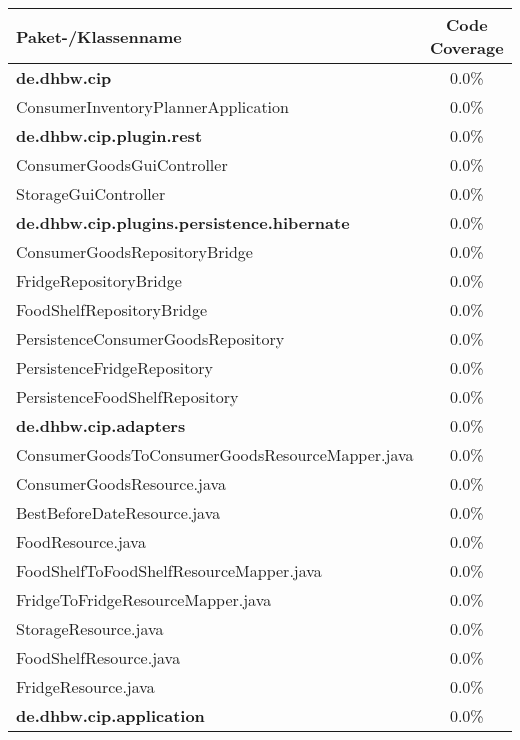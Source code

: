 \begin{table}[ht]
    \begin{tabular}{|l|c|}
        \hline
        \textbf{Paket-/Klassenname} & \textbf{Code Coverage} \\
        \hline
        \textbf{de.dhbw.cip} & 0.0\% \\
        \hline
        ConsumerInventoryPlannerApplication & 0.0\% \\
        \hline
        \textbf{de.dhbw.cip.plugin.rest} & 0.0\% \\
        \hline
        ConsumerGoodsGuiController & 0.0\% \\
        \hline
        StorageGuiController & 0.0\% \\
        \hline
        \textbf{de.dhbw.cip.plugins.persistence.hibernate} & 0.0\% \\
        \hline
        ConsumerGoodsRepositoryBridge & 0.0\% \\
        \hline
        FridgeRepositoryBridge & 0.0\% \\
        \hline
        FoodShelfRepositoryBridge & 0.0\% \\
        \hline
        PersistenceConsumerGoodsRepository & 0.0\% \\
        \hline
        PersistenceFridgeRepository & 0.0\% \\
        \hline
        PersistenceFoodShelfRepository & 0.0\% \\
        \hline
        \textbf{de.dhbw.cip.adapters} & 0.0\% \\
        \hline
        ConsumerGoodsToConsumerGoodsResourceMapper.java & 0.0\% \\
        \hline
        ConsumerGoodsResource.java & 0.0\% \\
        \hline
        BestBeforeDateResource.java & 0.0\% \\
        \hline
        FoodResource.java & 0.0\% \\
        \hline
        FoodShelfToFoodShelfResourceMapper.java & 0.0\% \\
        \hline
        FridgeToFridgeResourceMapper.java & 0.0\% \\
        \hline
        StorageResource.java & 0.0\% \\
        \hline
        FoodShelfResource.java & 0.0\% \\
        \hline
        FridgeResource.java & 0.0\% \\
        \hline
        \textbf{de.dhbw.cip.application} & 0.0\% \\

\end{tabular}
\end{table}
